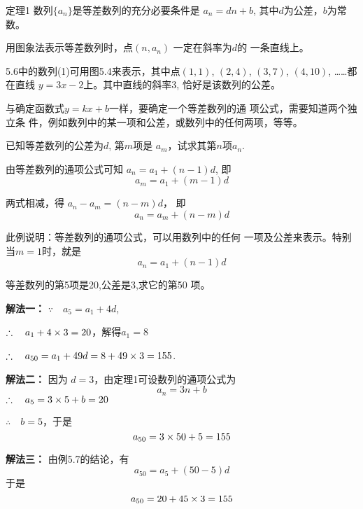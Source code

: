\begin{thm}
{定理1} 数列$\{a_n\}$是等差数列的充分必要条件是
$a_n=dn+b$, 其中$d$为公差，$b$为常数。
\end{thm}

用图象法表示等差数列时，点$(n,a_n)$
一定在斜率为$d$的
一条直线上。

5.6中的数列(1)可用图5.4来表示，其中点$(1,1)$,
$(2,4)$, $(3,7)$, $(4,10)$, ……都在直线
$y=3x-2$上。其中直线的斜率3, 恰好是该数列的公差。

\begin{figure}[htp]
    \centering
{}
    \caption{}
\end{figure}


与确定函数式$y=kx+b$一样，要确定一个等差数列的通
项公式，需要知道两个独立条
件，例如数列中的某一项和公差，或数列中的任何两项，等等。

\begin{example}
   已知等差数列的公差为$d$, 第$m$项是
$a_m$，试求其第$n$项$a_n$. 
\end{example}

\begin{solution}
    由等差数列的通项公式可知
$a_n=a_1+(n-1)d$, 
即
\[a_m=a_1+(m-1)d\]

两式相减，得
$a_n-a_m=(n-m)d$，
即
\[a_n=a_m+(n-m)d\]
\end{solution}

此例说明：等差数列的通项公式，可以用数列中的任何
一项及公差来表示。特别当$m=1$时，就是
\[a_n=a_1+(n-1)d\]

\begin{example}
    等差数列的第5项是20,公差是3,求它的第50
项。
\end{example}

\begin{solution}
 \textbf{解法一：} $\because\quad a_5=a_1+4d$,

$\therefore\quad a_1+4\times3=20$，解得$a_1=8$

$\therefore\quad a_{50}=a_1+49d=8+49\times3=155$.

\textbf{解法二：} 因为
$d=3$，由定理1可设数列的通项公式为
\[a_n=3n+b\]
$\therefore\quad a_5=3\times5+b=20$

$\therefore\quad b=5$，于是
\[a_{50}=3\times50+5=155\]

\textbf{解法三：} 由例5.7的结论，有
\[a_{50}=a_5+(50-5)d\]
于是
\[a_{50}=20+45\times3=155\]
\end{solution}

